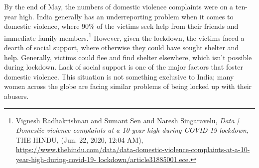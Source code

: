 \begin{multicols}{2}
\noi 
By the end of May, the numbers of domestic violence complaints were on a ten-year high.
India generally has an underreporting problem when it comes to domestic violence, where
90\% of the victims seek help from their friends and immediate family members.\footnote{Vignesh Radhakrishnan and Sumant Sen and Naresh Singaravelu, \textit{Data | Domestic violence complaints at a
10-year high during COVID-19 lockdown}, THE HINDU, (Jun. 22, 2020, 12:04 AM),
\url{https://www.thehindu.com/data/data-domestic-violence-complaints-at-a-10-year-high-during-covid-19-
lockdown/article31885001.ece.}} However,
given the lockdown, the victims faced a dearth of social support, where otherwise they could
have sought shelter and help. Generally, victims could flee and find shelter elsewhere, which
isn’t possible during lockdown. Lack of social support is one of the major factors that foster
domestic violence. This situation is not something exclusive to India; many women across the
globe are facing similar problems of being locked up with their abusers. 




\end{multicols}
